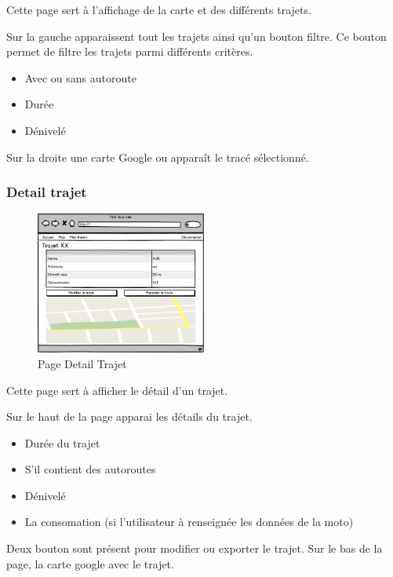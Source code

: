 \documentclass[a4paper]{article}
\begin{document}
Cette page sert à l'affichage de la carte et des différents trajets.

Sur la gauche apparaissent tout les trajets ainsi qu'un bouton filtre.
Ce bouton permet de filtre les trajets parmi différents critères.
\begin{itemize}
    \item Avec ou sans autoroute
    \item Durée
    \item Dénivelé
\end{itemize}
Sur la droite une carte Google ou apparaît le tracé sélectionné.

\subsubsection{Detail trajet}
\begin{figure}[h]
\centering
\includegraphics[width=0.5\textwidth]{./Images/Interfaces/DetailTrajet.png}
\caption{Page Detail Trajet}
\end{figure}

Cette page sert à afficher le détail d'un trajet.

Sur le haut de la page apparai les détails du trajet.
\begin{itemize}
    \item Durée du trajet
    \item S'il contient des autoroutes
    \item Dénivelé
    \item La consomation (si l'utilisateur à renseignée les données de la moto)
\end{itemize}
Deux bouton sont présent pour modifier ou exporter le trajet.
Sur le bas de la page, la carte google avec le trajet.
\end{document}
